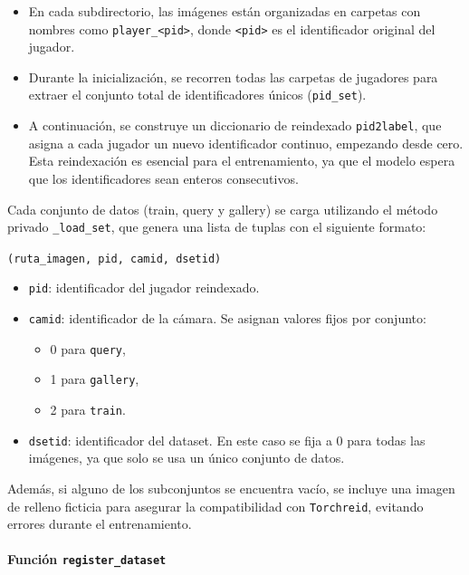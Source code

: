 \documentclass[12pt, a4paper, twoside]{article}
\begin{document}
	\begin{itemize}
		\item En cada subdirectorio, las imágenes están organizadas en carpetas con nombres como \texttt{player\_<pid>}, donde \texttt{<pid>} es el identificador original del jugador.
		\item Durante la inicialización, se recorren todas las carpetas de jugadores para extraer el conjunto total de identificadores únicos (\texttt{pid\_set}).
		\item A continuación, se construye un diccionario de reindexado \texttt{pid2label}, que asigna a cada jugador un nuevo identificador continuo, empezando desde cero. Esta reindexación es esencial para el entrenamiento, ya que el modelo espera que los identificadores sean enteros consecutivos.
	\end{itemize}
	
	Cada conjunto de datos (train, query y gallery) se carga utilizando el método privado \texttt{\_load\_set}, que genera una lista de tuplas con el siguiente formato:
	
	\begin{center}
		\texttt{(ruta\_imagen, pid, camid, dsetid)}
	\end{center}
	
	\begin{itemize}
		\item \texttt{pid}: identificador del jugador reindexado.
		\item \texttt{camid}: identificador de la cámara. Se asignan valores fijos por conjunto:
		\begin{itemize}
			\item 0 para \texttt{query},
			\item 1 para \texttt{gallery},
			\item 2 para \texttt{train}.
		\end{itemize}
		\item \texttt{dsetid}: identificador del dataset. En este caso se fija a 0 para todas las imágenes, ya que solo se usa un único conjunto de datos.
	\end{itemize}
	
	Además, si alguno de los subconjuntos se encuentra vacío, se incluye una imagen de relleno ficticia para asegurar la compatibilidad con \texttt{Torchreid}, evitando errores durante el entrenamiento.
	
	\paragraph{Función \texttt{register\_dataset}}
	
\end{document}
